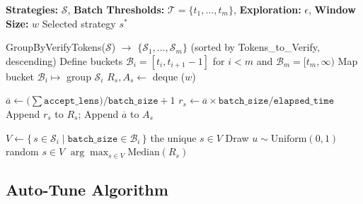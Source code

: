 \documentclass[sigplan,screen]{acmart}
\begin{document}
\begin{algorithm}[t]
    \caption{Bucketed-Epsilon-Greedy (BEG) MAB Selector}
    \small
    \label{alg:beg}
    \begin{algorithmic}[1]
        \Input \textbf{Strategies:} $\mathcal{S}$, \textbf{Batch Thresholds:} $\mathcal{T}=\{t_1,\dots,t_m\}$, \textbf{Exploration:} $\epsilon$, \textbf{Window Size:} $w$
        \Output Selected strategy $s^*$

            \State GroupByVerifyTokens($\mathcal{S}$) $\rightarrow$ $\{\mathcal{S}_1,\dots,\mathcal{S}_m\}$ (sorted by Tokens\_to\_Verify, descending)
            \State Define buckets $\mathcal{B}_i = [t_i, t_{i+1}\!-\!1]$ for $i<m$ and $\mathcal{B}_m=[t_m,\infty)$
            \State Map bucket $\mathcal{B}_i \mapsto$ group $\mathcal{S}_i$
                \State $R_s, A_s \gets$ deque ($w$) 
            \EndFor
        \EndProcedure

            \State $\overline{a} \gets \big(\sum \texttt{accept\_lens}\big)/\texttt{batch\_size} + 1$
            \State $r_s \gets \overline{a} \times \texttt{batch\_size} / \texttt{elapsed\_time}$ \label{line:record}
            \State Append $r_s$ to $R_s$; Append $\overline{a}$ to $A_s$ 
        \EndProcedure

            \State $V \gets \{\,s \in \mathcal{S}_i \mid \texttt{batch\_size}\in \mathcal{B}_i\,\}$ 
                \State \Return the unique $s\in V$
            \EndIf
            \State Draw $u \sim \mathrm{Uniform}(0,1)$
                \State \Return random $s \in V$ 
            \Else
                \State \Return $\arg\max_{s \in V} \mathrm{Median}(R_s)$ 
            \EndIf
        \EndProcedure
    \end{algorithmic}
\end{algorithm}





\subsection{Auto-Tune Algorithm}
\end{document}
